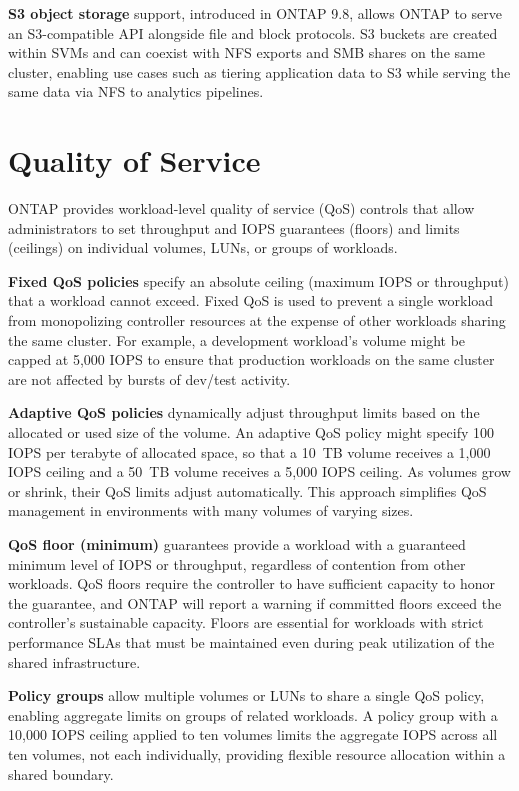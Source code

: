 \textbf{S3 object storage} support, introduced in ONTAP 9.8, allows ONTAP to serve an S3-compatible API alongside file and block protocols. S3 buckets are created within SVMs and can coexist with NFS exports and SMB shares on the same cluster, enabling use cases such as tiering application data to S3 while serving the same data via NFS to analytics pipelines.

\section{Quality of Service}

ONTAP provides workload-level quality of service (QoS) controls that allow administrators to set throughput and IOPS guarantees (floors) and limits (ceilings) on individual volumes, LUNs, or groups of workloads.

\textbf{Fixed QoS policies} specify an absolute ceiling (maximum IOPS or throughput) that a workload cannot exceed. Fixed QoS is used to prevent a single workload from monopolizing controller resources at the expense of other workloads sharing the same cluster. For example, a development workload's volume might be capped at 5,000 IOPS to ensure that production workloads on the same cluster are not affected by bursts of dev/test activity.

\textbf{Adaptive QoS policies} dynamically adjust throughput limits based on the allocated or used size of the volume. An adaptive QoS policy might specify 100 IOPS per terabyte of allocated space, so that a 10~TB volume receives a 1,000 IOPS ceiling and a 50~TB volume receives a 5,000 IOPS ceiling. As volumes grow or shrink, their QoS limits adjust automatically. This approach simplifies QoS management in environments with many volumes of varying sizes.

\textbf{QoS floor (minimum)} guarantees provide a workload with a guaranteed minimum level of IOPS or throughput, regardless of contention from other workloads. QoS floors require the controller to have sufficient capacity to honor the guarantee, and ONTAP will report a warning if committed floors exceed the controller's sustainable capacity. Floors are essential for workloads with strict performance SLAs that must be maintained even during peak utilization of the shared infrastructure.

\textbf{Policy groups} allow multiple volumes or LUNs to share a single QoS policy, enabling aggregate limits on groups of related workloads. A policy group with a 10,000 IOPS ceiling applied to ten volumes limits the aggregate IOPS across all ten volumes, not each individually, providing flexible resource allocation within a shared boundary.

